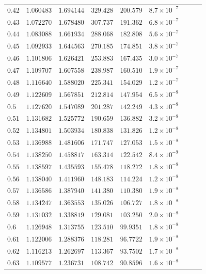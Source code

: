 \documentclass[12pt]{extarticle}
\theoremstyle{plain}
\theoremstyle{remark}
\begin{document}
\begin{longtable}{lcccccccc}
$0.42$ & $1.060483$ & $1.694144$ & $329.428$ & $200.579$ & $8.7\times10^{-7}$ \\
$0.43$ & $1.072270$ & $1.678480$ & $307.737$ & $191.362$ & $6.8\times10^{-7}$ \\
$0.44$ & $1.083088$ & $1.661934$ & $288.068$ & $182.808$ & $5.6\times10^{-7}$ \\
$0.45$ & $1.092933$ & $1.644563$ & $270.185$ & $174.851$ & $3.8\times10^{-7}$ \\
$0.46$ & $1.101806$ & $1.626421$ & $253.883$ & $167.435$ & $3.0\times10^{-7}$ \\
$0.47$ & $1.109707$ & $1.607558$ & $238.987$ & $160.510$ & $1.9\times10^{-7}$ \\
$0.48$ & $1.116640$ & $1.588020$ & $225.341$ & $154.029$ & $1.2\times10^{-7}$ \\
$0.49$ & $1.122609$ & $1.567851$ & $212.814$ & $147.954$ & $6.5\times10^{-8}$ \\
$0.5$ & $1.127620$ & $1.547089$ & $201.287$ & $142.249$ & $4.3\times10^{-8}$ \\
$0.51$ & $1.131682$ & $1.525772$ & $190.659$ & $136.882$ & $3.2\times10^{-8}$ \\
$0.52$ & $1.134801$ & $1.503934$ & $180.838$ & $131.826$ & $1.2\times10^{-8}$ \\
$0.53$ & $1.136988$ & $1.481606$ & $171.747$ & $127.053$ & $1.5\times10^{-8}$ \\
$0.54$ & $1.138250$ & $1.458817$ & $163.314$ & $122.542$ & $8.4\times10^{-9}$ \\
$0.55$ & $1.138597$ & $1.435593$ & $155.478$ & $118.272$ & $1.8\times10^{-8}$ \\
$0.56$ & $1.138040$ & $1.411960$ & $148.183$ & $114.224$ & $1.2\times10^{-8}$ \\
$0.57$ & $1.136586$ & $1.387940$ & $141.380$ & $110.380$ & $1.9\times10^{-8}$ \\
$0.58$ & $1.134247$ & $1.363553$ & $135.026$ & $106.727$ & $1.8\times10^{-8}$ \\
$0.59$ & $1.131032$ & $1.338819$ & $129.081$ & $103.250$ & $2.0\times10^{-8}$ \\
$0.6$ & $1.126948$ & $1.313755$ & $123.510$ & $99.9351$ & $1.8\times10^{-8}$ \\
$0.61$ & $1.122006$ & $1.288376$ & $118.281$ & $96.7722$ & $1.9\times10^{-8}$ \\
$0.62$ & $1.116213$ & $1.262697$ & $113.367$ & $93.7502$ & $1.7\times10^{-8}$ \\
$0.63$ & $1.109577$ & $1.236731$ & $108.742$ & $90.8596$ & $1.6\times10^{-8}$ \\

\end{longtable}
\end{document}
